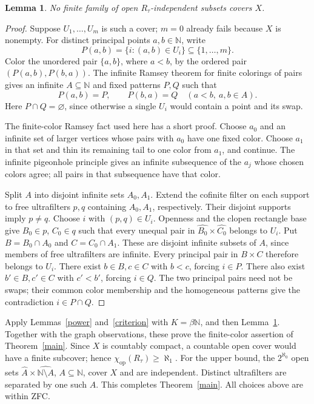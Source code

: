 \documentclass[11pt]{article}
\newtheorem{lemma}[theorem]{Lemma}
\newcommand{\N}{\mathbb N}
\newcommand{\hatset}[1]{\widehat{#1}}
\newcommand{\op}{\mathrm{op}}
\begin{document}
\begin{lemma}\label{color}
No finite family of open $R_\tau$-independent subsets covers $X$.
\end{lemma}
\begin{proof}
Suppose $U_1,\ldots,U_m$ is such a cover; $m=0$ already fails
because $X$ is nonempty. For distinct principal points $a,b\in\N$,
write
\[
 P(a,b)=\{i:(a,b)\in U_i\}\subseteq\{1,\ldots,m\}.
\]
Color the unordered pair $\{a,b\}$, where $a<b$, by the ordered
pair $(P(a,b),P(b,a))$. The infinite Ramsey theorem for finite
colorings of pairs gives an infinite $A\subseteq\N$ and fixed
patterns $P,Q$ such that
\[
 P(a,b)=P,\qquad P(b,a)=Q\quad(a<b,\ a,b\in A).
\]
Here $P\cap Q=\varnothing$, since otherwise a single $U_i$ would
contain a point and its swap.

The finite-color Ramsey fact used here has a short proof. Choose
$a_0$ and an infinite set of larger vertices whose pairs with $a_0$
have one fixed color. Choose $a_1$ in that set and thin its remaining
tail to one color from $a_1$, and continue. The infinite pigeonhole
principle gives an infinite subsequence of the $a_j$ whose chosen
colors agree; all pairs in that subsequence have that color.

Split $A$ into disjoint infinite sets $A_0,A_1$. Extend the cofinite
filter on each support to free ultrafilters $p,q$ containing $A_0,A_1$,
respectively. Their disjoint supports imply $p\ne q$. Choose
$i$ with $(p,q)\in U_i$. Openness and the clopen rectangle base give
$B_0\in p$, $C_0\in q$ such that every unequal pair in
$\hatset{B_0}\times\hatset{C_0}$ belongs to $U_i$. Put
$B=B_0\cap A_0$ and $C=C_0\cap A_1$. These are disjoint infinite
subsets of $A$, since members of free ultrafilters are infinite.
Every principal pair in $B\times C$ therefore belongs to $U_i$.
There exist $b\in B,c\in C$ with $b<c$, forcing $i\in P$.
There also exist $b'\in B,c'\in C$ with $c'<b'$, forcing $i\in Q$.
The two principal pairs need not be swaps; their common color
membership and the homogeneous patterns give the contradiction
$i\in P\cap Q$.
\end{proof}

Apply Lemmas~\ref{power} and~\ref{criterion} with $K=\beta\N$,
and then Lemma~\ref{color}. Together with the graph observations,
these prove the finite-color assertion of Theorem~\ref{main}.
Since $X$ is countably compact, a countable open cover would have a finite
subcover; hence $\chi_\op(R_\tau)\ge\aleph_1$.
For the upper bound, the $2^{\aleph_0}$ open sets
$\hatset A\times\hatset{\N\setminus A}$, $A\subseteq\N$, cover $X$
and are independent. Distinct ultrafilters are separated by one such $A$.
This completes Theorem~\ref{main}. All choices above are within ZFC.
\end{document}
